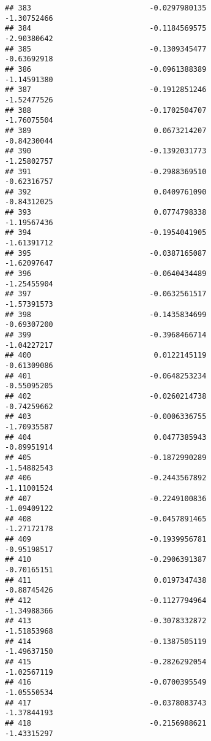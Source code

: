 \documentclass[
]{article}
\begin{document}
\begin{verbatim}
## 383                           -0.0297980135                -1.30752466
## 384                           -0.1184569575                -2.90380642
## 385                           -0.1309345477                -0.63692918
## 386                           -0.0961388389                -1.14591380
## 387                           -0.1912851246                -1.52477526
## 388                           -0.1702504707                -1.76075504
## 389                            0.0673214207                -0.84230044
## 390                           -0.1392031773                -1.25802757
## 391                           -0.2988369510                -0.62316757
## 392                            0.0409761090                -0.84312025
## 393                            0.0774798338                -1.19567436
## 394                           -0.1954041905                -1.61391712
## 395                           -0.0387165087                -1.62097647
## 396                           -0.0640434489                -1.25455904
## 397                           -0.0632561517                -1.57391573
## 398                           -0.1435834699                -0.69307200
## 399                           -0.3968466714                -1.04227217
## 400                            0.0122145119                -0.61309086
## 401                           -0.0648253234                -0.55095205
## 402                           -0.0260214738                -0.74259662
## 403                           -0.0006336755                -1.70935587
## 404                            0.0477385943                -0.89951914
## 405                           -0.1872990289                -1.54882543
## 406                           -0.2443567892                -1.11001524
## 407                           -0.2249100836                -1.09409122
## 408                           -0.0457891465                -1.27172178
## 409                           -0.1939956781                -0.95198517
## 410                           -0.2906391387                -0.70165151
## 411                            0.0197347438                -0.88745426
## 412                           -0.1127794964                -1.34988366
## 413                           -0.3078332872                -1.51853968
## 414                           -0.1387505119                -1.49637150
## 415                           -0.2826292054                -1.02567119
## 416                           -0.0700395549                -1.05550534
## 417                           -0.0378083743                -1.37844193
## 418                           -0.2156988621                -1.43315297

\end{verbatim}
\end{document}
